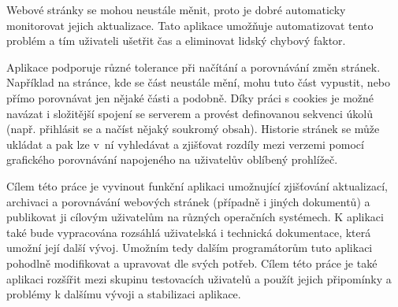 
Webové stránky se mohou neustále měnit, proto je dobré automaticky monitorovat jejich aktualizace.
Tato aplikace umožňuje automatizovat tento problém a tím uživateli ušetřit čas a eliminovat lidský chybový faktor.

Aplikace podporuje různé tolerance při načítání a porovnávání změn stránek.
Například na stránce, kde se část neustále mění, mohu tuto část vypustit, nebo přímo porovnávat jen nějaké části a podobně. Díky práci s cookies je možné navázat i složitější spojení se serverem a provést definovanou sekvenci úkolů (např. přihlásit se a načíst nějaký soukromý obsah). Historie stránek se může ukládat a pak lze v~ní vyhledávat a zjišťovat rozdíly mezi verzemi pomocí grafického porovnávání napojeného na uživatelův oblíbený prohlížeč.


Cílem této práce je vyvinout funkční aplikaci umožnující zjišťování aktualizací, archivaci a porovnávání webových stránek (případně i jiných dokumentů) a publikovat ji cílovým uživatelům na různých operačních systémech.
K aplikaci také bude vypracována rozsáhlá uživatelská i technická dokumentace, která umožní její další vývoj.
Umožním tedy dalším programátorům tuto aplikaci pohodlně modifikovat a upravovat dle svých potřeb.
Cílem této práce je také aplikaci rozšířit mezi skupinu testovacích uživatelů a použít jejich připomínky a problémy k dalšímu vývoji a stabilizaci aplikace.
